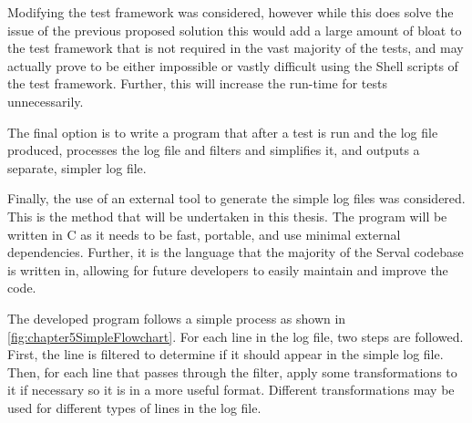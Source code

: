 Modifying the test framework was considered, however while this does solve the issue of the previous proposed solution this would add a large amount of bloat to the test framework that is not required in the vast majority of the tests, and may actually prove to be either impossible or vastly difficult using the Shell scripts of the test framework.
Further, this will increase the run-time for tests unnecessarily.

The final option is to write a program that after a test is run and the log file produced, processes the log file and filters and simplifies it, and outputs a separate, simpler log file. 

Finally, the use of an external tool to generate the simple log files was considered.
This is the method that will be undertaken in this thesis. 
The program will be written in C as it needs to be fast, portable, and use minimal external dependencies. 
Further, it is the language that the majority of the Serval codebase is written in, allowing for future developers to easily maintain and improve the code.

The developed program follows a simple process as shown in \figurename{ \ref{fig:chapter5SimpleFlowchart}}.
For each line in the log file, two steps are followed.
First, the line is filtered to determine if it should appear in the simple log file. 
Then, for each line that passes through the filter, apply some transformations to it if necessary so it is in a more useful format.
Different transformations may be used for different types of lines in the log file.

